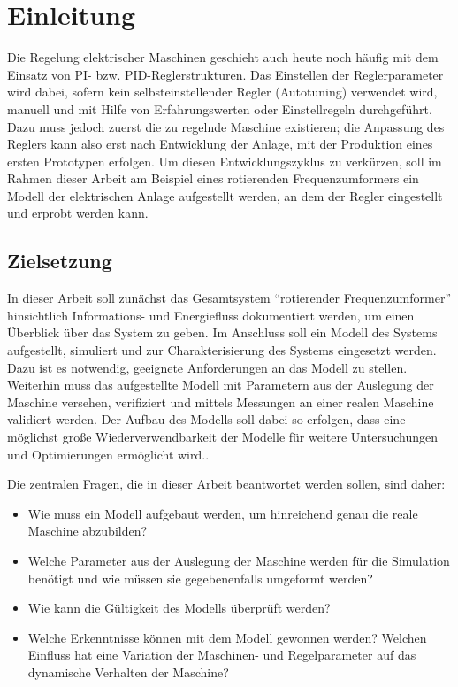 \chapter{Einleitung}
\label{chap:Einleitung}
Die Regelung elektrischer Maschinen geschieht auch heute noch häufig mit
dem Einsatz von PI- bzw. PID-Reglerstrukturen. Das Einstellen der
Reglerparameter wird dabei, sofern kein selbsteinstellender Regler
(Autotuning) verwendet wird, manuell und mit Hilfe von Erfahrungswerten
oder Einstellregeln durchgeführt. Dazu muss jedoch zuerst die zu
regelnde Maschine existieren; die Anpassung des Reglers kann also erst
nach Entwicklung der Anlage, mit der Produktion eines ersten Prototypen
erfolgen. Um diesen Entwicklungszyklus zu verkürzen, soll im Rahmen
dieser Arbeit am Beispiel eines rotierenden Frequenzumformers ein Modell
der elektrischen Anlage aufgestellt werden, an dem der Regler
eingestellt und erprobt werden kann.

\section{Zielsetzung}
\label{sec:Zielsetzung}
In dieser Arbeit soll zunächst das Gesamtsystem ``rotierender
Frequenzumformer'' hinsichtlich Informations- und Energiefluss
dokumentiert werden, um einen Überblick über das System zu geben. Im
Anschluss soll ein Modell des Systems aufgestellt, simuliert und zur
Charakterisierung des Systems eingesetzt werden. Dazu ist es notwendig,
geeignete Anforderungen an das Modell zu stellen. Weiterhin muss das aufgestellte Modell
mit Parametern aus der Auslegung der Maschine versehen, verifiziert und mittels
Messungen an einer realen Maschine validiert werden. Der Aufbau des
Modells soll dabei so erfolgen, dass eine möglichst große
Wiederverwendbarkeit der Modelle für weitere Untersuchungen und Optimierungen ermöglicht wird..

Die zentralen Fragen, die in dieser Arbeit beantwortet werden sollen,
sind daher:
\begin{itemize}
\item Wie muss ein Modell aufgebaut werden, um hinreichend genau die reale Maschine abzubilden?
\item Welche Parameter aus der Auslegung der Maschine werden für die Simulation benötigt und wie müssen sie gegebenenfalls umgeformt werden?
\item Wie kann die Gültigkeit des Modells überprüft werden?
\item Welche Erkenntnisse können mit dem Modell gewonnen werden? Welchen Einfluss hat eine Variation der Maschinen- und Regelparameter auf das dynamische Verhalten der Maschine?
\end{itemize}

